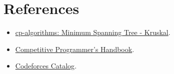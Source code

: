 \section*{References}

\begin{itemize}
  \item \href{https://cp-algorithms.com/graph/mst_kruskal.html}{cp-algorithms: Minimum Spanning Tree - Kruskal}.
  \item \href{https://usaco.guide/CPH.pdf}{Competitive Programmer's Handbook}.
  \item \href{https://codeforces.com/catalog}{Codeforces Catalog}.
\end{itemize}
